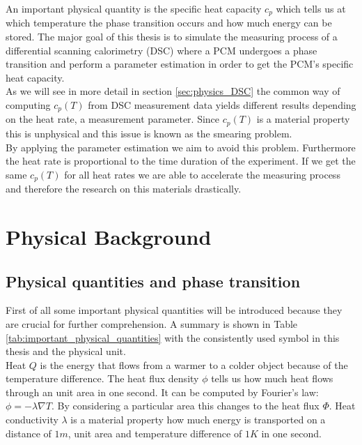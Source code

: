 \documentclass{scrartcl}[12pt, halfparskip]
\begin{document}
An important physical quantity is the specific heat capacity $c_p$ which tells us at which temperature the phase transition occurs and how much energy can be stored. The major goal of this thesis is to simulate the measuring process of a differential scanning calorimetry (DSC) where a PCM undergoes a phase transition and perform a parameter estimation in order to get the PCM's specific heat capacity. \\
As we will see in more detail in section \ref{sec:physics_DSC} the common way of computing $c_p(T)$ from DSC measurement data yields different results depending on the heat rate, a measurement parameter. Since $c_p(T)$ is a material property this is unphysical and this issue is known as the smearing problem. \\
By applying the parameter estimation we aim to avoid this problem. Furthermore the heat rate is proportional to the time duration of the experiment. If we get the same $c_p(T)$ for all heat rates we are able to accelerate the measuring process and therefore the research on this materials drastically. 
 


\section{Physical Background}
\subsection{Physical quantities and phase transition}

First of all some important physical quantities will be introduced because they are crucial for further comprehension. A summary is shown in Table \ref{tab:important_physical_quantities} with the consistently used symbol in this thesis and the physical unit. \\
Heat $Q$ is the energy that flows from a warmer to a colder object because of the temperature difference. The heat flux density $\phi$ tells us how much heat flows through an unit area in one second. It can be computed by Fourier's law: $\phi = - \lambda \nabla T$. By considering a particular area this changes to the heat flux $\varPhi$. Heat conductivity $\lambda$ is a material property how much energy is transported on a distance of $1m$, unit area and temperature difference of $1K$ in one second.
\end{document}
